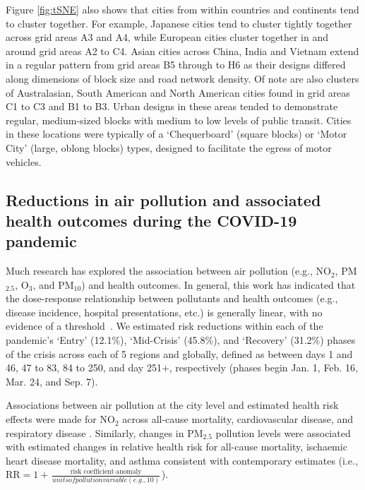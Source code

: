 \documentclass[preprint,10pt]{elsarticle} %
\begin{document}
Figure \ref{fig:tSNE} also shows that cities from within countries and continents tend to cluster together. For example, Japanese cities tend to cluster tightly together across grid areas A3 and A4, while European cities cluster together in and around grid areas A2 to C4. Asian cities across China, India and Vietnam extend in a regular pattern from grid areas B5 through to H6 as their designs differed along dimensions of block size and road network density. Of note are also clusters of Australasian, South American and North American cities found in grid areas C1 to C3 and B1 to B3. Urban designs in these areas tended to demonstrate regular, medium-sized blocks with medium to low levels of public transit. Cities in these locations were typically of a `Chequerboard' (square blocks) or `Motor City' (large, oblong blocks) types, designed to facilitate the egress of motor vehicles.

\subsection*{Reductions in air pollution and associated health outcomes during the COVID-19 pandemic}
Much research has explored the association between air pollution (e.g., NO$_{2}$, PM$_{2.5}$, O$_{3}$, and PM$_{10}$) and health outcomes. In general, this work has indicated that the dose-response relationship between pollutants and health outcomes (e.g., disease incidence, hospital presentations, etc.) is generally linear, with no evidence of a threshold~\cite{schwartz2002concentration}. We estimated risk reductions within each of the pandemic's `Entry' (12.1\%), `Mid-Crisis' (45.8\%), and `Recovery' (31.2\%) phases of the crisis across each of 5 regions and globally,  defined as between days 1 and 46, 47 to 83, 84 to 250, and day 251+, respectively (phases begin Jan. 1, Feb. 16, Mar. 24, and Sep. 7). 

Associations between air pollution at the city level and estimated health risk effects were made for NO$_{2}$ across all-cause mortality, cardiovascular disease, and respiratory disease \cite{Huang19Pollution}. Similarly, changes in PM$_{2.5}$ pollution levels were associated with estimated changes in relative health risk for all-cause mortality, ischaemic heart disease mortality, and asthma consistent with contemporary estimates \cite{Xie257, Yu2020PM2.5, BALTI2014161} (i.e., \( \mathrm{RR} = 1 + \frac{\text{risk coefficient} \cdot \text{anomaly}}{units of pollution variable (e.g., 10)} \)). 
\end{document}
